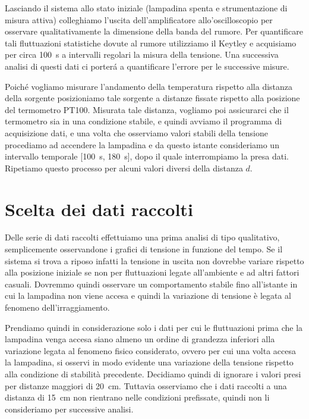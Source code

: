 \documentclass[
    rmp,
    reprint, 
    superscriptaddress, 
    altaffilletter, 
    amsmath, 
    amssymb,
    a4paper]{revtex4-2}
\begin{document}
Lasciando il sistema allo stato iniziale (lampadina spenta e strumentazione di misura attiva) colleghiamo l'uscita dell'amplificatore allo'oscilloscopio per osservare qualitativamente la dimensione della banda del rumore. 
Per quantificare tali fluttuazioni statistiche dovute al rumore utilizziamo il Keytley e acquisiamo per circa \SI{100}{\second} a intervalli regolari la misura della tensione. Una successiva analisi di questi dati ci porter\'a a quantificare l'errore per le successive misure.

Poiché vogliamo misurare l'andamento della temperatura rispetto alla distanza della sorgente posizioniamo tale sorgente a distanze fissate rispetto alla posizione del termometro PT100. Misurata tale distanza, vogliamo poi assicurarci che il termometro sia in una condizione stabile, e quindi avviamo il programma di acquisizione dati, e una volta che osserviamo valori stabili della tensione procediamo ad accendere la lampadina e da questo istante consideriamo un intervallo temporale [\SI{100}{\second}, \SI{180}{\second}], dopo il quale interrompiamo la presa dati. Ripetiamo questo processo per alcuni valori diversi della distanza $d$.

\section*{Scelta dei dati raccolti}
Delle serie di dati raccolti effettuiamo una prima analisi di tipo qualitativo, semplicemente osservandone i grafici di tensione in funzione del tempo. Se il sistema si trova a riposo infatti la tensione in uscita non dovrebbe variare rispetto alla posizione iniziale se non per fluttuazioni legate all'ambiente e ad altri fattori casuali. Dovremmo quindi osservare un comportamento stabile fino all'istante in cui la lampadina non viene accesa e quindi la variazione di tensione è legata al fenomeno dell'irraggiamento. 

Prendiamo quindi in considerazione solo i dati per cui le fluttuazioni prima che la lampadina venga accesa siano almeno un ordine di grandezza inferiori alla variazione legata al fenomeno fisico considerato, ovvero per cui una volta accesa la lampadina, si osservi in modo evidente una variazione della tensione rispetto alla condizione di stabilità precedente. Decidiamo quindi di ignorare i valori presi per distanze maggiori di \SI{20}{\centi\metre}. Tuttavia  osserviamo che i dati raccolti a una distanza di \SI{15}{\centi\metre} non rientrano nelle condizioni prefissate, quindi non li consideriamo per successive analisi. 
\end{document}
